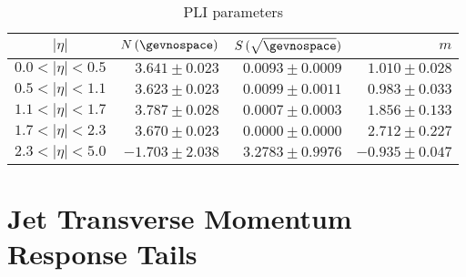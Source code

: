 \begin{table}[!ht]
  \caption{PLI parameters
  }
  \begin{center}
    \begin{tabular}{crrr}
      \toprule
      $|\eta|$ &  $N\,(\gevnospace)$ & $S\,(\sqrt{\gevnospace})$ & $m$ \\
      \midrule
      $ 0.0 < |\eta| < 0.5$ & $3.641 \pm 0.023$ & $0.0093 \pm 0.0009$  & $1.010 \pm 0.028$ \\
      $ 0.5 < |\eta| < 1.1$ & $3.623 \pm 0.023$ & $0.0099 \pm 0.0011$  & $0.983 \pm 0.033$ \\
      $ 1.1 < |\eta| < 1.7$ & $3.787 \pm 0.028$ & $0.0007 \pm 0.0003$  & $1.856 \pm 0.133$ \\
      $ 1.7 < |\eta| < 2.3$ & $3.670 \pm 0.023$ & $0.0000 \pm 0.0000$  & $2.712 \pm 0.227$ \\
      $ 2.3 < |\eta| < 5.0$ & $-1.703 \pm 2.038$ & $3.2783 \pm 0.9976$ & $-0.935 \pm 0.047$ \\
      \bottomrule
    \end{tabular}
  \end{center}
  \label{tab:App:ResCore:PLIParameters}
\end{table}


\section{Jet Transverse Momentum Response Tails} \label{sec:App:ResTail}


